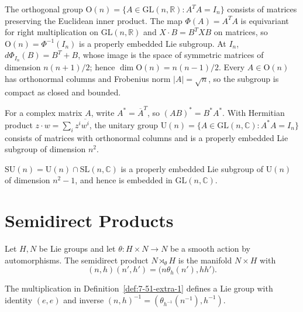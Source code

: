 \begin{example}
\label{ex:7-27}
\leanok
{}
The orthogonal group $\mathrm O(n)=\{A\in\mathrm{GL}(n,\mathbb R):A^TA=I_n\}$ consists of matrices preserving the Euclidean inner product. The map $\Phi(A)=A^TA$ is equivariant for right multiplication on $\mathrm{GL}(n,\mathbb R)$ and $X\cdot B=B^TXB$ on matrices, so $\mathrm O(n)=\Phi^{-1}(I_n)$ is a properly embedded Lie subgroup. At $I_n$, $d\Phi_{I_n}(B)=B^T+B$, whose image is the space of symmetric matrices of dimension $n(n+1)/2$; hence $\dim\mathrm O(n)=n(n-1)/2$. Every $A\in\mathrm O(n)$ has orthonormal columns and Frobenius norm $\lvert A\rvert=\sqrt n$, so the subgroup is compact as closed and bounded.
\end{example}

\begin{example}
\label{ex:7-29}
\mathlibok
{}
For a complex matrix $A$, write $A^*=\overline A^T$, so $(AB)^*=B^*A^*$. With Hermitian product $z\cdot w=\sum_i z^i\overline{w^i}$, the unitary group $\mathrm U(n)=\{A\in\mathrm{GL}(n,\mathbb C):A^*A=I_n\}$ consists of matrices with orthonormal columns and is a properly embedded Lie subgroup of dimension $n^2$.
\end{example}

\begin{example}
\label{ex:7-30}
\mathlibok
{}
$\mathrm{SU}(n)=\mathrm U(n)\cap\mathrm{SL}(n,\mathbb C)$ is a properly embedded Lie subgroup of $\mathrm U(n)$ of dimension $n^2-1$, and hence is embedded in $\mathrm{GL}(n,\mathbb C)$.
\end{example}

\section{Semidirect Products}

\begin{definition}
\label{def:7-51-extra-1}
\leanok
Let $H,N$ be Lie groups and let $\theta:H\times N\to N$ be a smooth action by automorphisms. The semidirect product $N\rtimes_\theta H$ is the manifold $N\times H$ with
\[
(n,h)(n',h')=\bigl(n\theta_h(n'),hh'\bigr).
\]
\end{definition}

\begin{proposition}
\label{exer:7-31}
\leanok
{}
The multiplication in Definition~\ref{def:7-51-extra-1} defines a Lie group
with identity $(e,e)$ and inverse
$(n,h)^{-1}=(\theta_{h^{-1}}(n^{-1}),h^{-1})$.
\end{proposition}

